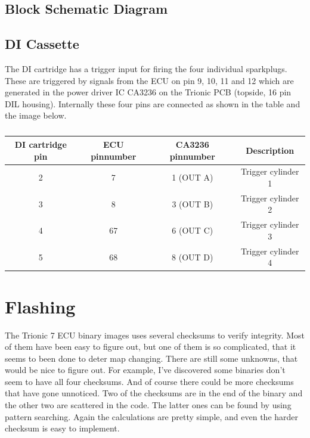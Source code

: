 \documentclass[11pt,a4paper]{book}
\begin{document}
\section{Block Schematic Diagram}
\begin{figure}[]
    \centering
    \missingfigure{}
    \caption{}
    \label{fig:}
\end{figure}

\section{DI Cassette}
The DI cartridge has a trigger input for firing the four individual sparkplugs. These are triggered by
signals from the ECU on pin 9, 10, 11 and 12 which are generated in the power driver IC CA3236 on
the Trionic PCB (topside, 16 pin DIL housing). Internally these four pins are connected as shown in
the table and the image below.

\begin{table}
    \centering
    \begin{tabular}{cccc}
        DI cartridge pin & ECU pinnumber &  CA3236 pinnumber &  Description \\
        \midrule
        2 & 7 & 1 (OUT A) & Trigger cylinder 1 \\
        3 & 8 & 3 (OUT B) & Trigger cylinder 2 \\
        4 & 67 & 6 (OUT C) & Trigger cylinder 3 \\
        5 & 68 & 8 (OUT D) & Trigger cylinder 4 \\
    \end{tabular}
    \caption{}
    \label{tab:}
\end{table}

\chapter{Flashing}
The Trionic 7 ECU binary images uses several checksums to verify integrity. Most
of them have been easy to figure out, but one of them is so complicated, that it
seems to been done to deter map changing. There are still some unknowns, that
would be nice to figure out. For example, I've discovered some binaries don't
seem to have all four checksums. And of course there could be more checksums
that have gone unnoticed. Two of the checksums are in the end of the binary and
the other two are scattered in the code. The latter ones can be found by using
pattern searching. Again the calculations are pretty simple, and even the harder
checksum is easy to implement.
\end{document}
